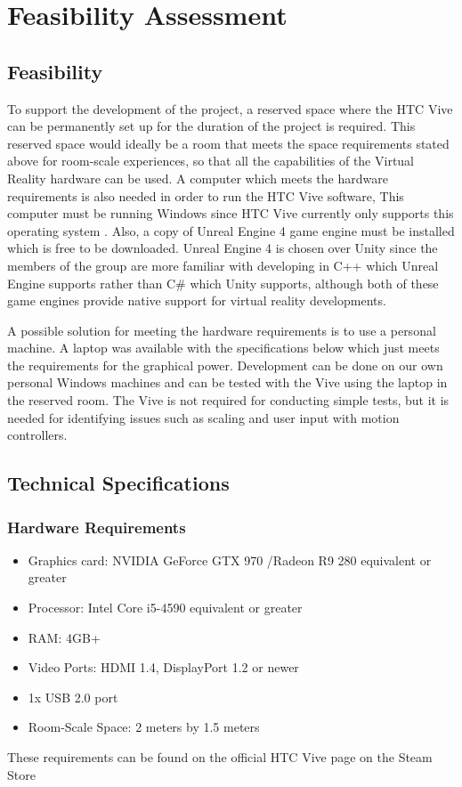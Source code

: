 \section{Feasibility Assessment}
\subsection{Feasibility}
To support the development of the project, a reserved space where the HTC Vive can be permanently set up for the duration of the project is required. This reserved space would ideally be a room that meets the space requirements stated above for room-scale experiences, so that all the capabilities of the Virtual Reality hardware can be used. A computer which meets the hardware requirements is also needed in order to run the HTC Vive software, This computer must be running Windows since HTC Vive currently only supports this operating system \cite{vivenolinux}. Also, a copy of Unreal Engine 4 game engine must be installed which is free to be downloaded. Unreal Engine 4 is chosen over Unity since the members of the group are more familiar with developing in C++ which Unreal Engine supports rather than C\# which Unity supports, although both of these game engines provide native support for virtual reality developments.
\newline
\par
A possible solution for meeting the hardware requirements is to use a personal machine. A laptop was available with the specifications below which just meets the requirements for the graphical power. Development can be done on our own personal Windows machines and can be tested with the Vive using the laptop in the reserved room. The Vive is not required for conducting simple tests, but it is needed for identifying issues such as scaling and user input with motion controllers.

\subsection{Technical Specifications}

\subsubsection{Hardware Requirements}
\begin{itemize}
	\item Graphics card: NVIDIA GeForce GTX 970 /Radeon R9 280 equivalent or greater
	\item Processor: Intel Core i5-4590 equivalent or greater
	\item RAM: 4GB+
	\item Video Ports: HDMI 1.4, DisplayPort 1.2 or newer 
	\item 1x USB 2.0 port
	\item Room-Scale Space: 2 meters by 1.5 meters
\end{itemize}

These requirements can be found on the official HTC Vive page on the Steam Store \cite{vivehardware}